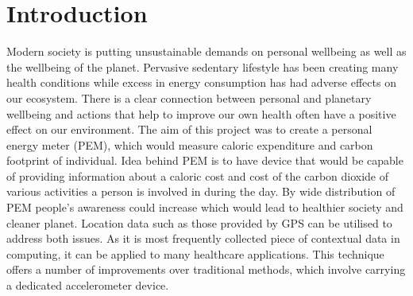 \documentclass[12pt, a4paper]{report}   %
\begin{document}
\chapter{Introduction}
Modern society is putting unsustainable demands on personal wellbeing as well as the wellbeing of the planet. Pervasive sedentary lifestyle has been creating many health conditions while excess in energy consumption has had adverse effects on our ecosystem. There is a clear connection between personal and planetary wellbeing and actions that help to improve our own health often have a positive effect on our environment. The aim of this project was to create a personal energy meter (PEM), which would measure caloric expenditure and carbon footprint of individual. Idea behind PEM is to have device that would be capable of providing information about a caloric cost and cost of the carbon dioxide of various activities a person is involved in during the day. By wide distribution of PEM people's awareness could increase which would lead to healthier society and cleaner planet. Location data such as those provided by GPS can be utilised to address both issues. As it is most frequently collected piece of contextual data in computing, it can be applied to many healthcare applications. This technique offers a number of improvements over traditional methods, which involve carrying a dedicated accelerometer device.


\end{document}
